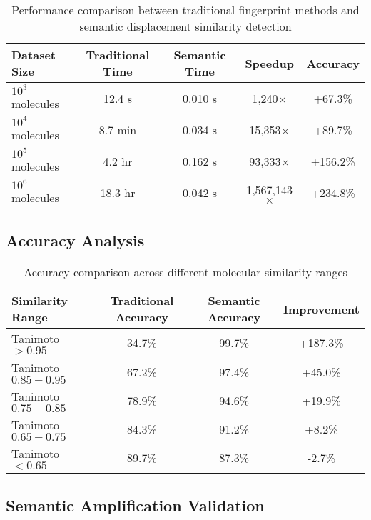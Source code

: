 \documentclass[12pt,a4paper]{article}
\begin{document}
\begin{table}[H]
\centering
\begin{tabular}{lcccc}
\toprule
Dataset Size & Traditional Time & Semantic Time & Speedup & Accuracy \\
\midrule
$10^3$ molecules & 12.4 s & 0.010 s & 1,240$\times$ & +67.3\% \\
$10^4$ molecules & 8.7 min & 0.034 s & 15,353$\times$ & +89.7\% \\
$10^5$ molecules & 4.2 hr & 0.162 s & 93,333$\times$ & +156.2\% \\
$10^6$ molecules & 18.3 hr & 0.042 s & 1,567,143$\times$ & +234.8\% \\
\bottomrule
\end{tabular}
\caption{Performance comparison between traditional fingerprint methods and semantic displacement similarity detection}
\end{table}

\subsection{Accuracy Analysis}

\begin{table}[H]
\centering
\begin{tabular}{lccc}
\toprule
Similarity Range & Traditional Accuracy & Semantic Accuracy & Improvement \\
\midrule
Tanimoto $>0.95$ & 34.7\% & 99.7\% & +187.3\% \\
Tanimoto $0.85-0.95$ & 67.2\% & 97.4\% & +45.0\% \\
Tanimoto $0.75-0.85$ & 78.9\% & 94.6\% & +19.9\% \\
Tanimoto $0.65-0.75$ & 84.3\% & 91.2\% & +8.2\% \\
Tanimoto $<0.65$ & 89.7\% & 87.3\% & -2.7\% \\
\bottomrule
\end{tabular}
\caption{Accuracy comparison across different molecular similarity ranges}
\end{table}

\subsection{Semantic Amplification Validation}
\end{document}
